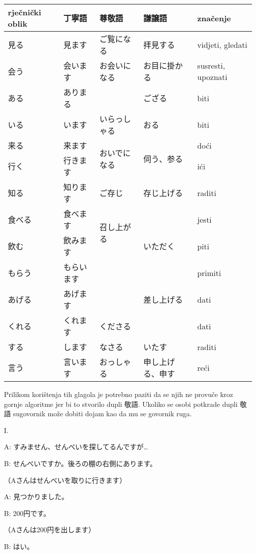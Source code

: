 	\begin{table}[h]
		\centering
		\begin{tabular}{l l l l l}\toprule[2pt]
			rječnički oblik & 丁寧語 & 尊敬語 & 謙譲語　& značenje\\
			\midrule
			見る & 見ます & ご覧になる & 拝見する & vidjeti, gledati\\
			会う & 会います & お会いになる & お目に掛かる & susresti, upoznati \\
			ある & ありまる & & ござる & biti\\
			いる & います & いらっしゃる & おる & biti\\
			来る & 来ます & \multirow{2}{100pt}{おいでになる} & \multirow{2}{100pt}{伺う、参る} & doći\\
			行く & 行きます &  & & ići\\
			知る & 知ります & ご存じ & 存じ上げる & raditi\\
			食べる　& 食べます & \multirow{2}{100pt}{召し上がる} & \multirow{3}{100pt}{いただく} & jesti\\
			飲む　& 飲みます & & & piti\\
			もらう & もらいます & & & primiti\\
			あげる　& あげます & & 差し上げる & dati\\
			くれる　& くれます & くださる & & dati\\
			する　& します & なさる & いたす & raditi\\
			言う & 言います & おっしゃる　& 申し上げる、申す & reći\\
			\bottomrule[2pt]
		\end{tabular}
	\end{table}
	
	Prilikom korištenja tih glagola je potrebno paziti da se njih ne provuče kroz gornje algoritme jer bi to stvorilo dupli 敬語. Ukoliko se osobi potkrade dupli 敬語 sugovornik može dobiti dojam kao da mu se govornik ruga.
	\newpage
	
	I.
	
	A: すみません、せんべいを探してるんですが…
	
	B: せんべいですか。後ろの棚の右側にあります。
	
	（Aさんはせんべいを取りに行きます）
	
	A: 見つかりました。	
	
	B: 200円です。
	
	（Aさんは200円を出します）
	
	B: はい。

